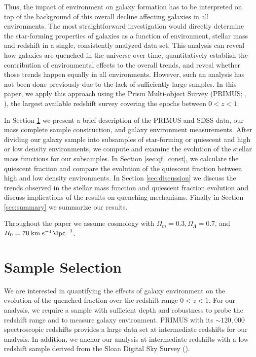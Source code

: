 \documentclass{emulateapj}
\begin{document}
Thus, the impact of environment on galaxy formation has to be
interpreted on top of the background of this overall decline affecting
galaxies in all environments. The most straightforward investigation
would directly determine the star-forming properties of galaxies as
a function of environment, stellar mass and redshift in a single,
consistently analyzed data set. This analysis can reveal how galaxies
are quenched in the universe over time, quantitatively establish the
contribution of environmental effects to the overall trends, and
reveal whether those trends happen equally in all environments.
However, such an analysis has not been done previously due to the lack
of sufficiently large samples. In this paper, we apply this approach
using the Prism Multi-object Survey (PRIMUS; \cite{Coil:2011aa}, 
\cite{Cool:2013aa}), the largest available redshift survey covering the epochs
between $0<z<1$.

In Section \ref{sec:sample} we present a brief description of the PRIMUS and SDSS data, our mass complete sample construction, and galaxy environment measurements. After dividing our galaxy sample into subsamples of star-forming or quiescent and high or low density environments, we compute and examine the evolution of the stellar mass functions for our subsamples. In Section \ref{sec:qf_const}, we calculate the quiescent fraction and compare the evolution of the quiescent fraction between high and low density environments. In Section \ref{sec:discussion} we discuss the trends observed in the stellar mass function and quiescent fraction evolution and discuss implications of the results on quenching mechanisms. Finally in Section \ref{sec:summary} we summarize our results. 

Throughout the paper we assume cosmology with $\Omega_{m} = 0.3, \Omega_{\Lambda} = 0.7$, and $H_0 = 70 \: \rm{km} \; \rm{s}^{-1} \rm{Mpc}^{-1}$.
\section{Sample Selection} \label{sec:sample}
We are interested in quantifying the effects of galaxy environment on the evolution of the quenched fraction over the redshift range $0 < z < 1$. For our analysis, we require a sample with sufficient depth and robustness to probe the redshift range and to measure galaxy environment. PRIMUS with its $\sim 120,000$ spectroscopic redshifts provides a large data set at intermediate redshifts for our analysis. In addition, we anchor our analysis at intermediate redshifts with a low redshift sample derived from the Sloan Digital Sky Survey (\cite{York:2000aa}). 
\end{document}
